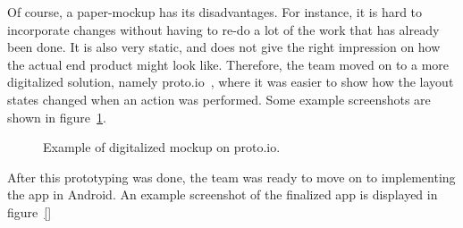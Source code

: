 Of course, a paper-mockup has its disadvantages. For instance, it is hard to incorporate changes without having to re-do a lot of the work that has already been done. It is also very static, and does not give the right impression on how the actual end product might look like. Therefore, the team moved on to a more digitalized solution, namely proto.io~\cite{protoio}, where it was easier to show how the layout states changed when an action was performed. Some example screenshots are shown in figure~\ref{fig:designProtoIO}.

\begin{figure}[H]
  \centering
\quad
\caption{Example of digitalized mockup on proto.io.}
\label{fig:designProtoIO}
\end{figure}

After this prototyping was done, the team was ready to move on to implementing the app in Android. An example screenshot of the finalized app is displayed in figure~\ref{} 

